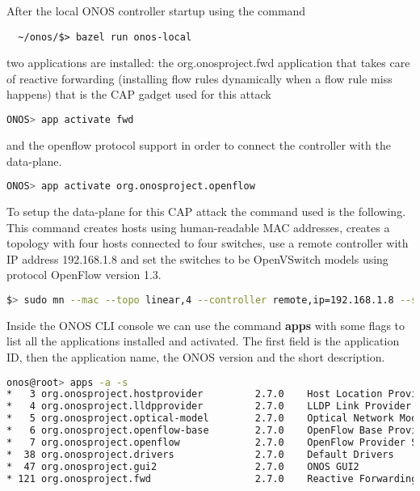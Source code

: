 \documentclass[a4paper,10pt]{memoir}
\begin{document}
After the local ONOS controller startup using the command
\begin{lstlisting}
  ~/onos/$> bazel run onos-local
\end{lstlisting}

two applications are installed: the org.onosproject.fwd application that takes care of reactive forwarding (installing flow rules dynamically when a flow rule miss happens) that is the CAP gadget used for this attack
\begin{lstlisting}[language=bash]
  ONOS> app activate fwd
\end{lstlisting}

and the openflow protocol support in order to connect the controller with the data-plane.
\begin{lstlisting}[language=bash]
  ONOS> app activate org.onosproject.openflow
\end{lstlisting}


To setup the data-plane for this CAP attack the command used is the following. This command creates hosts using human-readable MAC addresses, creates a topology with four hosts connected to four switches, use a remote controller with IP address 192.168.1.8 and set the switches to be OpenVSwitch models using protocol OpenFlow version 1.3.
\begin{lstlisting}[language=bash]
  $> sudo mn --mac --topo linear,4 --controller remote,ip=192.168.1.8 --switch ovs,protocols=OpenFlow13
\end{lstlisting}

Inside the ONOS CLI console we can use the command \textbf{apps} with some flags to list all the applications installed and activated. The first field is the application ID, then the application name, the ONOS version and the short description.
\begin{lstlisting}[language=bash]
onos@root> apps -a -s                                                      
*   3 org.onosproject.hostprovider         2.7.0    Host Location Provider
*   4 org.onosproject.lldpprovider         2.7.0    LLDP Link Provider
*   5 org.onosproject.optical-model        2.7.0    Optical Network Model
*   6 org.onosproject.openflow-base        2.7.0    OpenFlow Base Provider
*   7 org.onosproject.openflow             2.7.0    OpenFlow Provider Suite
*  38 org.onosproject.drivers              2.7.0    Default Drivers
*  47 org.onosproject.gui2                 2.7.0    ONOS GUI2
* 121 org.onosproject.fwd                  2.7.0    Reactive Forwarding
\end{lstlisting}
\end{document}
